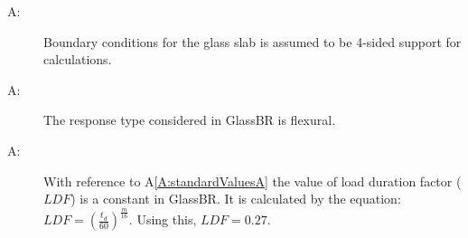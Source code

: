 \documentclass[12pt]{article}
\newcounter{assumpnum}
\newcommand{\atheassumpnum}{A\theassumpnum}
\begin{document}
\begin{description}
\item[\atheassumpnum\label{A:bndryConditionsA}:]Boundary conditions for the glass slab is assumed to be 4-sided support for calculations.
\end{description}
\begin{description}
\item[\atheassumpnum\label{A:responseTyA}:]The response type considered in GlassBR is flexural.
\end{description}
\begin{description}
\item[\atheassumpnum\label{A:ldfConstantA}:]With reference to A\ref{A:standardValuesA} the value of load duration factor ($LDF$) is a constant in GlassBR. It is calculated by the equation: $LDF=\left(\frac{{t_{d}}}{60}\right)^{\frac{m}{16}}$. Using this, $LDF=0.27$.
\end{description}
\end{document}
